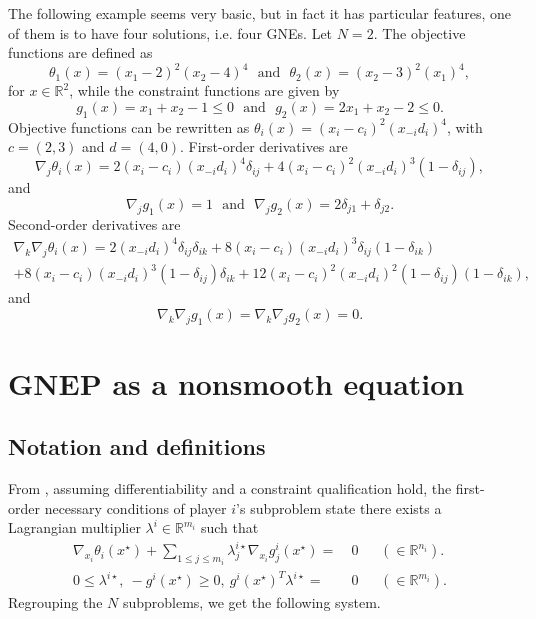 \documentclass[11pt]{article}
\newcommand{\txtm}[1]{\textrm{~~#1~~}}
\newcommand{\R}{\ensuremath{\mathbb{R}}}
\begin{document}
The following example seems very basic, but in fact it has particular features, one of them is to have four solutions, i.e. four GNEs.
Let $N=2$. The objective functions are defined as
$$
\theta_1(x) = (x_1-2)^2 (x_2-4)^4 \txtm{and} \theta_2(x) = (x_2-3)^2 (x_1)^4,
$$
for $x\in \R^2$, while the constraint functions are given by
$$
g_1(x) = x_1+x_2-1 \leq 0 \txtm{and} g_2(x) = 2x_1+x_2-2 \leq 0.
$$
Objective functions can be rewritten as $\theta_i(x) = (x_i - c_i)^2 (x_{-i} d_i)^4$, with $c = (2, 3)$ and
$d=(4,0)$.
First-order derivatives are 
$$
\nabla_j \theta_i(x) = 2 (x_i - c_i) (x_{-i} d_i)^4 \delta_{ij} +  4(x_i - c_i)^2 (x_{-i} d_i)^3 (1- \delta_{ij}),
$$
and
$$
\nabla_j g_1(x) = 1
\txtm{and}
\nabla_j g_2(x) = 2 \delta_{j1} + \delta_{j2}.
$$
Second-order derivatives are
\begin{equation*}
\begin{split}
\nabla_k \nabla_j \theta_i(x) = 2 (x_{-i} d_i)^4 \delta_{ij} \delta_{ik}  
+ 8 (x_i - c_i) (x_{-i} d_i)^3 \delta_{ij} (1-\delta_{ik}) \\
+ 8(x_i - c_i) (x_{-i} d_i)^3 (1- \delta_{ij})  \delta_{ik} 
+ 12(x_i - c_i)^2 (x_{-i} d_i)^2 (1- \delta_{ij})(1- \delta_{ik} ),
\end{split}
\end{equation*}
and
$$
\nabla_k \nabla_j g_1(x) =  \nabla_k \nabla_j g_2(x) = 0.
$$


\section{GNEP as a nonsmooth equation}


\subsection{Notation and definitions}



From \cite{facchfischpic09}, 
assuming differentiability and a constraint qualification hold, the first-order necessary conditions of player $i$'s subproblem state there exists a Lagrangian multiplier
 $\lambda^i \in  \R^{m_i} $ such that 
\begin{equation*}
\begin{split}
\nabla_{x_i} \theta_{i}(x^\star)   + \sum_{ 1 \leq j \leq m_i } \lambda_{j}^{i\star} \nabla_{x_i} g_{j}^i(x^\star) = &~0~~~~~~~ ( \in \R^{n_i} ). \\
0 \leq \lambda^{i\star},~  - g^i(x^\star) \geq 0,~  g^i(x^\star)^T\lambda^{i\star}= & ~0~~~~~~~ ( \in \R^{m_i} ) .
\end{split}
\end{equation*}
Regrouping the $N$ subproblems, we get the following system.
\end{document}
